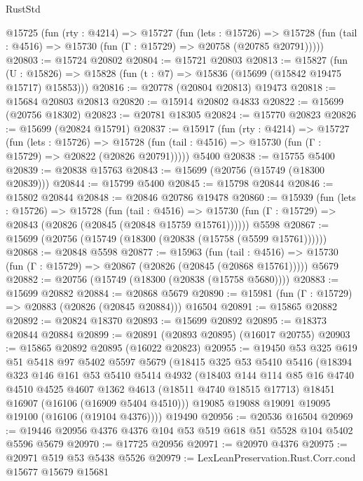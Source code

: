 \begin{lexlean}{RustStd}
\begin{coremodule}
  @15725
    (fun (rty : @4214) =>
    @15727
      (fun (lets : @15726) =>
      @15728 (fun (tail : @4516) => @15730 (fun (Γ : @15729) => @20758 (@20785 @20791)))))
@20803 := @15724 @20802
@20804 := @15721 @20803
@20813 := @15827
    (fun (U : @15826) => @15828 (fun (t : @7) => @15836 (@15699 (@15842 @19475 @15717) @15853)))
@20816 := @20778 (@20804 @20813) @19473
@20818 := @15684 @20803 @20813
@20820 := @15914 @20802 @4833
@20822 := @15699 (@20756 @18302)
@20823 := @20781 @18305
@20824 := @15770 @20823
@20826 := @15699 (@20824 @15791)
@20837 := @15917
    (fun (rty : @4214) =>
    @15727
      (fun (lets : @15726) =>
      @15728 (fun (tail : @4516) => @15730 (fun (Γ : @15729) => @20822 (@20826 @20791)))))
    @5400
@20838 := @15755 @5400
@20839 := @20838 @15763
@20843 := @15699 (@20756 (@15749 (@18300 @20839)))
@20844 := @15799 @5400
@20845 := @15798 @20844
@20846 := @15802 @20844
@20848 := @20846 @20786 @19478
@20860 := @15939
    (fun (lets : @15726) =>
    @15728
      (fun (tail : @4516) =>
      @15730 (fun (Γ : @15729) => @20843 (@20826 (@20845 (@20848 @15759 @15761))))))
    @5598
@20867 := @15699 (@20756 (@15749 (@18300 (@20838 (@15758 (@5599 @15761))))))
@20868 := @20848 @5598
@20877 := @15963
    (fun (tail : @4516) => @15730 (fun (Γ : @15729) => @20867 (@20826 (@20845 (@20868 @15761)))))
    @5679
@20882 := @20756 (@15749 (@18300 (@20838 (@15758 @5680))))
@20883 := @15699 @20882
@20884 := @20868 @5679
@20890 := @15981 (fun (Γ : @15729) => @20883 (@20826 (@20845 @20884))) @16504
@20891 := @15865 @20882
@20892 := @20824 @18370
@20893 := @15699 @20892
@20895 := @18373 @20844 @20884
@20899 := @20891 (@20893 @20895) (@16017 @20755)
@20903 := @15865 @20892 @20895 (@16022 @20823)
@20955 := @19450
    @53
    @325
    @619
    @51
    @5418
    @97
    @5402
    @5597
    @5679
    (@18415
      @325
      @53
      @5410
      @5416
      (@18394
        @323
        @146
        @161
        @53
        @5410
        @5414
        @4932
        (@18403
          @144
          @114
          @85
          @16
          @4740
          @4510
          @4525
          @4607
          @1362
          @4613
          (@18511 @4740 @18515 @17713)
          @18451
          @16907
          (@16106 (@16909 @5404 @4510)))
        @19085
        @19088
        @19091
        @19095
        @19100
        (@16106 (@19104 @4376))))
    @19490
@20956 := @20536 @16504
@20969 := @19446 @20956 @4376 @4376 @104 @53 @519 @618 @51 @5528 @104 @5402 @5596 @5679
@20970 := @17725 @20956
@20971 := @20970 @4376
@20975 := @20971 @519 @53 @5438 @5526
@20979 := LexLeanPreservation.Rust.Corr.cond @15677 @15679 @15681

\end{coremodule}
\end{lexlean}
